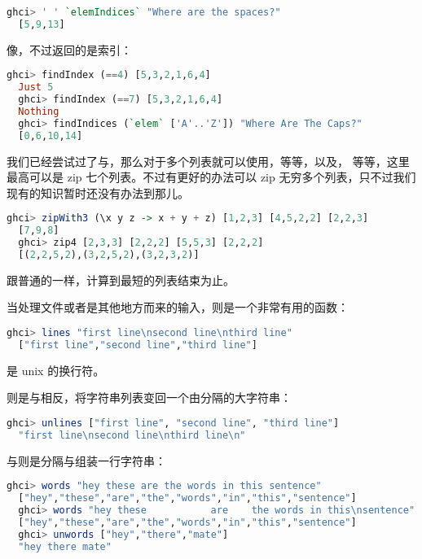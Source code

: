 \documentclass[./main.tex]{subfiles}
\begin{document}
\begin{lstlisting}[language=Haskell]
  ghci> ' ' `elemIndices` "Where are the spaces?"
  [5,9,13]
\end{lstlisting}

像，不过返回的是索引：

\begin{lstlisting}[language=Haskell]
  ghci> findIndex (==4) [5,3,2,1,6,4]
  Just 5
  ghci> findIndex (==7) [5,3,2,1,6,4]
  Nothing
  ghci> findIndices (`elem` ['A'..'Z']) "Where Are The Caps?"
  [0,6,10,14]
\end{lstlisting}

我们已经尝试过了与，那么对于多个列表就可以使用，等等，以及，
等等，这里最高可以是 zip 七个列表。不过有更好的办法可以 zip 无穷多个列表，只不过我们现有的知识暂时还没有办法到那儿。

\begin{lstlisting}[language=Haskell]
  ghci> zipWith3 (\x y z -> x + y + z) [1,2,3] [4,5,2,2] [2,2,3]
  [7,9,8]
  ghci> zip4 [2,3,3] [2,2,2] [5,5,3] [2,2,2]
  [(2,2,5,2),(3,2,5,2),(3,2,3,2)]
\end{lstlisting}

跟普通的一样，计算到最短的列表结束为止。

当处理文件或者是其他地方而来的输入，则是一个非常有用的函数：

\begin{lstlisting}[language=Haskell]
  ghci> lines "first line\nsecond line\nthird line"
  ["first line","second line","third line"]
\end{lstlisting}

是 unix 的换行符。

则是与相反，将字符串列表变回一个由分隔的大字符串：

\begin{lstlisting}[language=Haskell]
  ghci> unlines ["first line", "second line", "third line"]
  "first line\nsecond line\nthird line\n"
\end{lstlisting}

与则是分隔与组装一行字符串：

\begin{lstlisting}[language=Haskell]
  ghci> words "hey these are the words in this sentence"
  ["hey","these","are","the","words","in","this","sentence"]
  ghci> words "hey these           are    the words in this\nsentence"
  ["hey","these","are","the","words","in","this","sentence"]
  ghci> unwords ["hey","there","mate"]
  "hey there mate"
\end{lstlisting}
\end{document}

